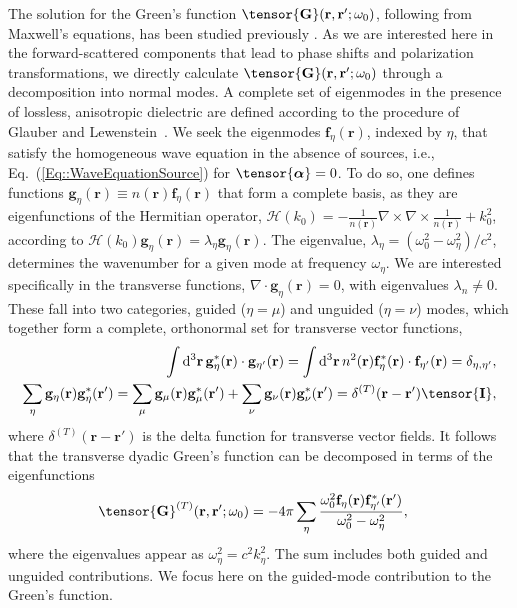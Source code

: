 \documentclass[preprint, aps,pra,onecolumn]{revtex4-1} %
\def\br{\mathbf{r}}
\newcommand{\erf}[1]{Eq.~(\ref{#1})}
\newcommand{\mbf}[1]{\mathbf{#1}}
\newcommand{\unittens}{\tensor{\mathbf{I}}}
\newcommand{\eigenf}{\mbf{f}_\eta}
\newcommand{\eigenfp}{\mbf{f}_{\eta'}}
\newcommand{\eigeng}{\mbf{g}_\eta}
\newcommand{\eigengp}{\mbf{g}_{\eta'}}
\begin{document}
The solution for the Green's function $\tensor{\mathbf{G}}(\br ,\br' ; \omega_0)$, following from Maxwell's equations,  
has been studied previously \cite{sakoda_optical_1996,sondergaard_general_2001,wubs_multiple-scattering_2004}.  As we are interested here in the forward-scattered components that lead to phase shifts and polarization transformations, we directly calculate $\tensor{\mathbf{G}}(\br ,\br' ; \omega_0)$ through a decomposition into normal modes.  A complete set of eigenmodes in the presence of lossless, anisotropic dielectric are defined according to the procedure of Glauber and Lewenstein~\cite{glauber_quantum_1991}.  We seek the eigenmodes $\eigenf(\mathbf{r})$, indexed by $\eta$, that satisfy the homogeneous wave equation in the absence of sources, i.e., \erf{Eq::WaveEquationSource} for $\tensor{\boldsymbol{\alpha}} = 0$.  To do so, one defines functions $\eigeng(\mbf{r}) \equiv n(\br) \eigenf(\mbf{r})$ that form a complete basis, as they are eigenfunctions of the Hermitian operator, $\mathcal{H}(k_0) = -\frac{1}{n(\br)} \nabla\times\nabla\times \frac{1}{n(\br)} + k_0^2$, according to $\mathcal{H}(k_0)  \eigeng(\mbf{r}) = \lambda_\eta \eigeng(\mbf{r})$. The eigenvalue, $\lambda_\eta= (\omega_0^2-\omega_\eta^2)/c^2$, determines the wavenumber for a given mode at frequency $\omega_\eta$.  We are interested specifically in the transverse functions, $\nabla\cdot \eigeng(\br) = 0$, with eigenvalues $\lambda_n \neq 0$.  These fall into two categories, guided ($\eta = \mu$) and unguided ($\eta = \nu$) modes, which together form a complete, orthonormal set for transverse vector functions,
	\begin{align}
	\int \mathrm{d}^3\br \, \eigeng^*(\mbf{r}) \cdot \eigengp(\mbf{r})  = \int \mathrm{d}^3\br \, n^2(\br) \eigenf^* (\br)\cdot  \eigenfp(\br) =\delta_{\eta, \eta'},\label{Eq::Orthogonality}\\
	 \sum_\eta \mathbf{g}_\eta(\br) \mathbf{g}_\eta^*(\br') =  \sum_\mu \mathbf{g}_\mu(\br) \mathbf{g}_\mu^*(\br')  + \sum_\nu \mathbf{g}_\nu(\br) \mathbf{g}_\nu^*(\br')  =\delta^{(T)}(\br-\br')  \unittens, \label{Eq::Completeness}
	\end{align}
where $\delta^{(T)}(\br-\br')$ is the delta function for transverse vector fields.  It follows that the transverse dyadic Green's function can be decomposed in terms of the eigenfunctions~\cite{sakoda_optical_1996, sondergaard_general_2001}
	\begin{align}
		\tensor{\mathbf{G}}^{(T)}(\br,\br'; \omega_0) &= -4\pi \sum_{\eta} \frac{  \omega_0^2 \eigenf (\br) 
\eigenfp^* (\br')}{\omega_0^2-\omega_\eta^2},
	\end{align}
where the eigenvalues appear as $\omega_\eta^2 = c^2 k_\eta^2$.  The sum includes both guided and unguided contributions. We focus here on the guided-mode contribution to the Green's function. 
\end{document}

